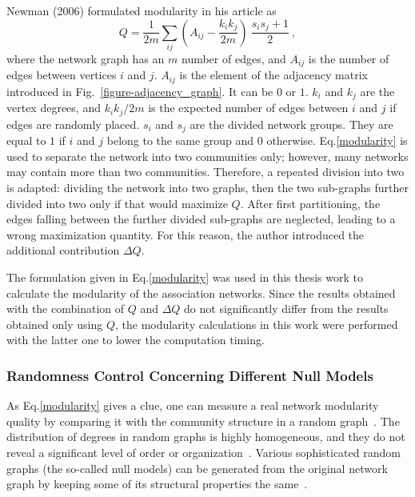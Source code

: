 Newman (2006) formulated modularity in his article as
\begin{equation} %
	Q = \frac {1} {2 m}\sum_ {ij} (A_{ij} - \frac {k_{i} k_{j}}{2 m}) \
	\frac {s_{i} s_{j} + 1} {2}\ ,
	\label{modularity}
\end{equation}
where the network graph has an $m$ number of edges, and $A_{ij}$ is the number of edges between vertices $i$ and $j$. $A_{ij}$ is the element of the adjacency matrix introduced in Fig.~\ref{figure-adjacency_graph}. It can be $0$ or $1$. $k_{i}$ and $k_{j}$ are the vertex degrees, and ${k_{i} k_{j}}/{2 m}$ is the expected number of edges between $i$ and $j$ if edges are randomly placed. $s_{i}$ and $s_{j}$ are the divided network groups. They are equal to $1$ if $i$ and $j$ belong to the same group and $0$ otherwise. Eq.\eqref{modularity} is used to separate the network into two communities only; however, many networks may contain more than two communities. Therefore, a repeated division into two is adapted: dividing the network into two graphs, then the two sub-graphs further divided into two only if that would maximize $Q$. After first partitioning, the edges falling between the further divided sub-graphs are neglected, leading to a wrong maximization quantity. For this reason, the author introduced the additional contribution $\Delta Q$.~\cite{Newman8577}

The formulation given in Eq.\eqref{modularity} was used in this thesis work to calculate the modularity of the association networks. Since the results obtained with the combination of $Q$ and $\Delta Q$ do not significantly differ from the results obtained only using $Q$, the modularity calculations in this work were performed with the latter one to lower the computation timing.

\subsubsection*{Randomness Control Concerning Different Null Models}
As Eq.\eqref{modularity} gives a clue, one can measure a real network modularity quality by comparing it with the community structure in a random graph~\cite{GirvanNewman2004}. The distribution of degrees in random graphs is highly homogeneous, and they do not reveal a significant level of order or organization~\cite{FORTUNATO201075}. Various sophisticated random graphs (the so-called null models) can be generated from the original network graph by keeping some of its structural properties the same~\cite{MERTEN2020, FORTUNATO201075, Enders2018}.


